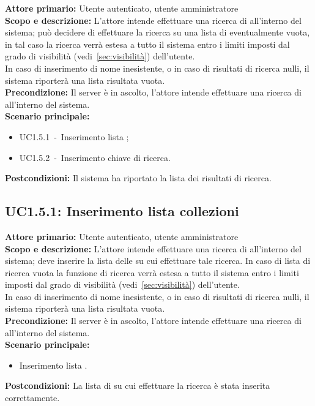 \documentclass{scalatekids-article}
\begin{document}
\textbf{Attore primario:} Utente autenticato, utente amministratore\\
\textbf{Scopo e descrizione:} L'attore intende effettuare una ricerca di  all'interno del sistema; può decidere di effettuare la ricerca su una lista di  eventualmente vuota, in tal caso la
ricerca verrà estesa a tutto il sistema entro i limiti imposti dal grado di visibilità (vedi~\ref{sec:visibilità}) dell'utente.\\
In caso di inserimento di nome  inesistente, o in caso di risultati di ricerca nulli, il sistema riporterà una lista risultata vuota.\\ %
\textbf{Precondizione:} Il server è in ascolto, l'attore intende effettuare una ricerca di  all'interno del sistema.\\
\textbf{Scenario principale:}
\begin{itemize}
\item UC1.5.1\ -\ Inserimento lista ;
\item UC1.5.2\ -\ Inserimento chiave di ricerca.
\end{itemize}
\textbf{Postcondizioni:} Il sistema ha riportato la lista dei risultati di ricerca.

\subsection{UC1.5.1: Inserimento lista collezioni}

\textbf{Attore primario:} Utente autenticato, utente amministratore\\
\textbf{Scopo e descrizione:} L'attore intende effettuare una ricerca di  all'interno del sistema; deve inserire la lista delle  su cui effettuare tale ricerca. In caso di lista di ricerca vuota
la funzione di ricerca verrà estesa a tutto il sistema entro i limiti imposti dal grado di visibilità (vedi~\ref{sec:visibilità}) dell'utente.\\
In caso di inserimento di nome  inesistente, o in caso di risultati di ricerca nulli, il sistema riporterà una lista risultata vuota.\\ %
\textbf{Precondizione:} Il server è in ascolto, l'attore intende effettuare una ricerca di  all'interno del  sistema.\\
\textbf{Scenario principale:}
\begin{itemize}
\item Inserimento lista .
\end{itemize}
\textbf{Postcondizioni:} La lista di  su cui effettuare la ricerca è stata inserita correttamente.
\end{document}
